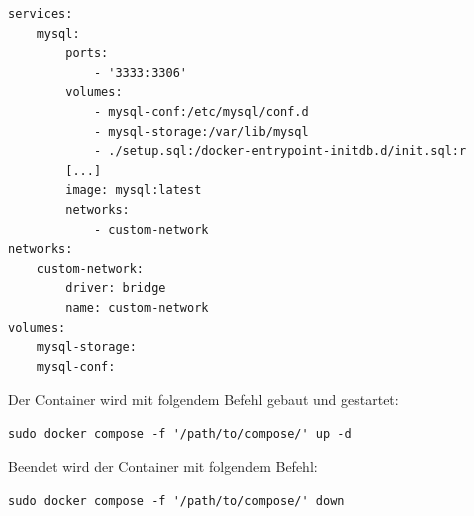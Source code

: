 \begin{lstlisting}[caption={Docker-Compose-Datei zum Aufsetzen und Starten der Container}]
services:
    mysql: 
        ports: 
            - '3333:3306'
        volumes: 
            - mysql-conf:/etc/mysql/conf.d
            - mysql-storage:/var/lib/mysql
            - ./setup.sql:/docker-entrypoint-initdb.d/init.sql:r
        [...]
        image: mysql:latest
        networks:
            - custom-network
networks: 
    custom-network:
        driver: bridge
        name: custom-network
volumes:
    mysql-storage:
    mysql-conf:
\end{lstlisting}

Der Container wird mit folgendem Befehl gebaut und gestartet:
\begin{lstlisting}[caption={Starten eines Docker-Containers}]
sudo docker compose -f '/path/to/compose/' up -d
\end{lstlisting}

Beendet wird der Container mit folgendem Befehl:
\begin{lstlisting}[caption={Beenden eines Docker-Containers}]
sudo docker compose -f '/path/to/compose/' down
\end{lstlisting}
